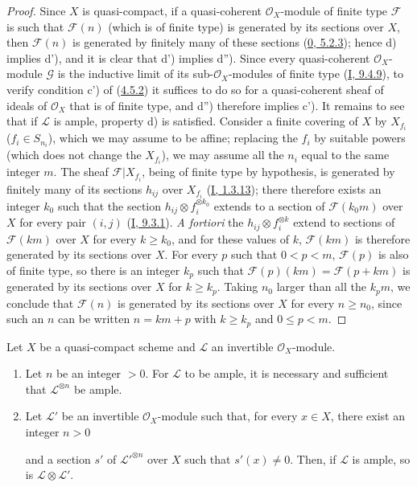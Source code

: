 \begin{proof}
Since $X$ is quasi-compact, if a quasi-coherent $\mathcal{O}_X$-module of
finite type $\mathcal{F}$ is such that $\mathcal{F}(n)$ (which is of finite type)
is generated by its sections over $X$, then $\mathcal{F}(n)$ is
generated by finitely many of these sections
(\hyperref[0.5.2.3]{0, 5.2.3}); hence d) implies d'), and it is clear that
d') implies d''). Since every quasi-coherent $\mathcal{O}_X$-module
$\mathcal{G}$ is the inductive limit of its sub-$\mathcal{O}_X$-modules of
finite type (\hyperref[I.9.4.9]{I, 9.4.9}), to verify condition c')
of (\hyperref[II.4.5.2]{4.5.2}) it suffices to do so for a quasi-coherent
sheaf of ideals of $\mathcal{O}_X$ that is of finite type, and d'')
therefore implies c'). It remains to see that if $\mathcal{L}$ is ample, property
d) is satisfied. Consider a finite covering of $X$ by
$X_{f_i}$ ($f_i\in S_{n_i}$), which we may assume to be affine; replacing the
$f_i$ by suitable powers (which does not change the $X_{f_i}$),
we may assume all the $n_i$ equal to the same integer $m$. The sheaf
$\mathcal{F}|X_{f_i}$, being of finite type by hypothesis, is generated by
finitely many of its sections $h_{ij}$ over $X_{f_i}$
(\hyperref[I.1.3.13]{I, 1.3.13}); there therefore exists an integer $k_0$ such that
the section $h_{ij}\otimes f_i^{\otimes k_0}$ extends to a section of
$\mathcal{F}(k_0m)$ over $X$ for every pair $(i,j)$
(\hyperref[I.9.3.1]{I, 9.3.1}). \emph{A fortiori} the
$h_{ij}\otimes f_i^{\otimes k}$ extend to sections of
$\mathcal{F}(km)$ over $X$ for every $k\geq k_0$, and for these values
of $k$, $\mathcal{F}(km)$ is therefore generated by its sections over
$X$. For every $p$ such that $0<p<m$, $\mathcal{F}(p)$ is also of finite type,
so there is an integer $k_p$ such that
$\mathcal{F}(p)(km)=\mathcal{F}(p+km)$ is generated by its sections
over $X$ for $k\geq k_p$. Taking $n_0$ larger than all the
$k_pm$, we conclude that $\mathcal{F}(n)$ is generated by its sections
over $X$ for every $n\geq n_0$, since such an $n$ can be written $n=km+p$ with
$k\geq k_p$ and $0\leq p<m$.
\end{proof}

\begin{proposition}[4.5.6]
\label{II.4.5.6}
Let $X$ be a quasi-compact scheme and $\mathcal{L}$ an invertible
$\mathcal{O}_X$-module.
\begin{enumerate}
  \item[\rm{(i)}] Let $n$ be an integer $>0$. For $\mathcal{L}$ to be
  ample, it is necessary and sufficient that $\mathcal{L}^{\otimes n}$ be ample.
  \item[\rm{(ii)}] Let $\mathcal{L}'$ be an invertible $\mathcal{O}_X$-module
  such that, for every $x\in X$, there exist an integer $n>0$


  and a section $s'$ of $\mathcal{L}'^{\otimes n}$ over $X$ such
  that $s'(x)\neq0$. Then, if $\mathcal{L}$ is ample, so is
  $\mathcal{L}\otimes\mathcal{L}'$.
\end{enumerate}
\end{proposition}


